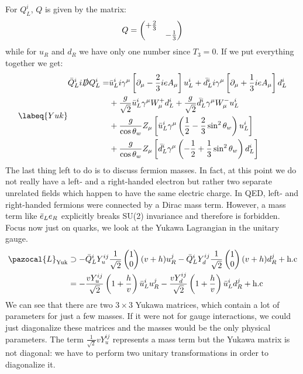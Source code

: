 \documentclass[../main.tex]{subfiles}
\begin{document}
For $Q_L^i$, $Q$ is given by the matrix:
\[
Q=\mqty(\dmat{+\frac{2}{3},-\frac{1}{3}})
\]
while for $u_R$ and $d_R$ we have only one number since $T_3=0$. If we put everything together we get:
\begin{equation}
\labeq{Yuk}
\begin{aligned}
\Bar{Q}_L^ii\slashed{D}Q_L^i=&\Bar{u}_L^ii\gamma^\mu\left[\partial_\mu-\frac{2}{3}ieA_\mu\right]u_L^i+\Bar{d}_L^ii\gamma^\mu\left[\partial_\mu+\frac{1}{3}ieA_\mu\right]d_L^i\\
&+\frac{g}{\sqrt{2}}\Bar{u}_L^i\gamma^\mu W_\mu^+d_L^i+\frac{g}{\sqrt{2}}\Bar{d}_L^i\gamma^\mu W_\mu^-u_L^i\\
&+\frac{g}{\cos\theta_w}Z_\mu\left[\Bar{u}_L^i\gamma^\mu\left(\frac{1}{2}-\frac{2}{3}\sin^2\theta_w\right)u_L^i\right]\\
&+\frac{g}{\cos\theta_w}Z_\mu\left[\Bar{d}_L^i\gamma^\mu\left(-\frac{1}{2}+\frac{1}{3}\sin^2\theta_w\right)d_L^i\right]
\end{aligned}
\end{equation}
The last thing left to do is to discuss fermion masses. In fact, at this point we do not really have a left- and a right-handed electron but rather two separate unrelated fields which happen to have the same electric charge. In QED, left- and right-handed fermions were connected by a Dirac mass term. However, a mass term like $\Bar{e}_Le_R$ explicitly breaks SU(2) invariance and therefore is forbidden.\\
Focus now just on quarks, we look at the Yukawa Lagrangian in the unitary gauge.
\begin{align*}
\pazocal{L}_{\text{Yuk}}&\supset-\Bar{Q}_L^iY_u^{ij}\frac{1}{\sqrt{2}}\begin{pmatrix}
    1\\0
\end{pmatrix}(v+h)u_R^j-\Bar{Q}_L^iY_d^{ij}\frac{1}{\sqrt{2}}\begin{pmatrix}
    1\\0
\end{pmatrix}(v+h)d_R^j+\text{h.c}\\
&=-\frac{vY_u^{ij}}{\sqrt{2}}\left(1+\frac{h}{v}\right)\Bar{u}_L^iu_R^j-\frac{vY_d^{ij}}{\sqrt{2}}\left(1+\frac{h}{v}\right)\Bar{u}_L^id_R^j+\text{h.c}
\end{align*}
We can see that there are two $3\times3$ Yukawa matrices, which contain a lot of parameters for just a few masses. If it were not for gauge interactions, we could just diagonalize these matrices and the masses would be the only physical parameters. The term $\frac{1}{\sqrt{2}}vY_u^{ij}$ represents a mass term but the Yukawa matrix is not diagonal: we have to perform two unitary transformations in order to diagonalize it.
\end{document}
